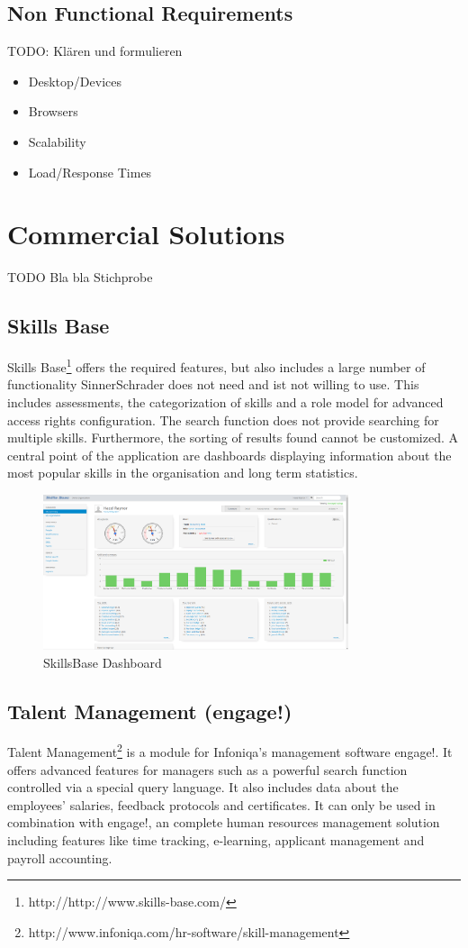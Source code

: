 \subsection{Non Functional Requirements}
TODO: Klären und formulieren
\begin{itemize}
	\item Desktop/Devices
	\item Browsers
	\item Scalability
	\item Load/Response Times
\end{itemize}



\section{Commercial Solutions}
TODO Bla bla Stichprobe

\subsection{Skills Base}
Skills Base\footnote{http://http://www.skills-base.com/} offers the required features, but also includes a large number of functionality SinnerSchrader does not need and ist not willing to use. This includes assessments, the categorization of skills and a role model for advanced access rights configuration.
The search function does not provide searching for multiple skills. Furthermore, the sorting of results found cannot be customized. A central point of the application are dashboards displaying information about the most popular skills in the organisation and long term statistics.
\begin{figure}[!htp]
    \centering
    \includegraphics[width=0.8\textwidth]{images/skillsbase-dashboard.png}
    \caption{SkillsBase Dashboard}
    \label{fig:skillsbase_dashboard}
\end{figure}

\subsection{Talent Management (engage!)}
Talent Management\footnote{http://www.infoniqa.com/hr-software/skill-management} is a module for Infoniqa’s management software engage!. It offers advanced features for managers such as a powerful search function controlled via a special query language. It also includes data about the employees’ salaries, feedback protocols and certificates. It can only be used in combination with engage!, an complete human resources management solution including features like time tracking, e-learning, applicant management and payroll accounting.

